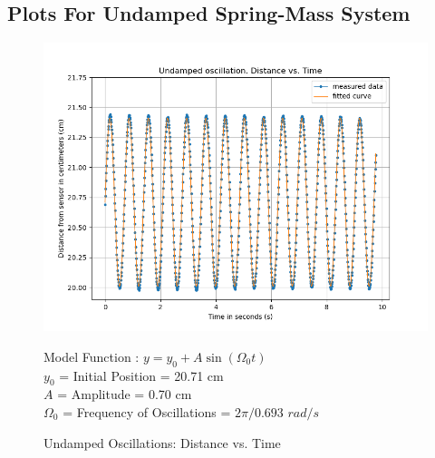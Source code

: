 \documentclass[letterpaper,12pt]{article}
\begin{document}
\subsection{Plots For Undamped Spring-Mass  System}
\begin{figure}[H]
  \centering
  \includegraphics[width=0.95\linewidth]{../Fredrik/Undamped oscillation. Distance vs. Time.png}    
  \begin{center}
    \begin{center}
      Model Function : $y = y_0 + A\sin(\Omega_0 t)$ \\
      $y_0$ = Initial Position  = 20.71 cm \\
      $A$ = Amplitude = 0.70 cm\\
      $\Omega_0$ = Frequency of  Oscillations = $2\pi / 0.693$ $rad/s$ \\      
    \end{center}  \end{center}
  \caption{Undamped Oscillations: Distance vs. Time}
  \label{undamped-d-t-plot}
\end{figure}
\end{document}
